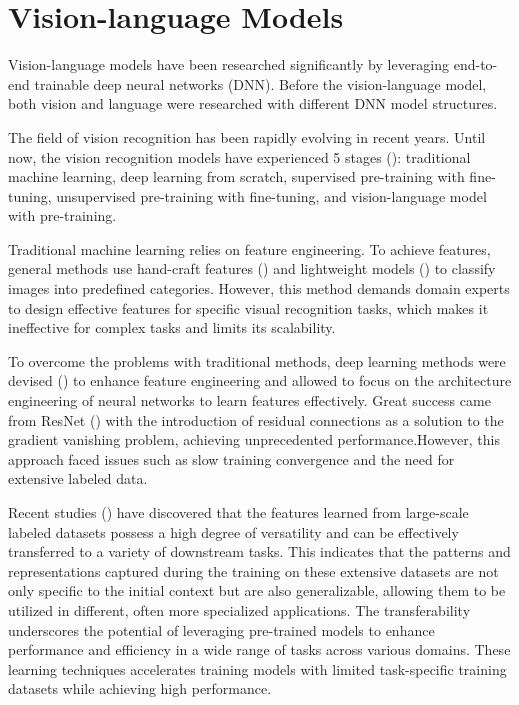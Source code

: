 
\section{Vision-language Models}
Vision-language models have been researched significantly by leveraging end-to-end trainable deep neural networks (DNN). Before the vision-language model, both vision and language were researched with different DNN model structures. 

The field of vision recognition has been rapidly evolving in recent years. Until now, the vision recognition models have experienced 5 stages (\cite{zhang2024visionlanguagemodelsvisiontasks}): traditional machine learning, deep learning from scratch, supervised pre-training with fine-tuning, unsupervised pre-training with fine-tuning, and vision-language model with pre-training.

Traditional machine learning relies on feature engineering. To achieve features, general methods use hand-craft features (\cite{svmclassification}) and lightweight models (\cite{knn, svm}) to classify images into predefined categories. However, this method demands domain experts to design effective features for specific visual recognition tasks, which makes it ineffective for complex tasks and limits its scalability.

To overcome the problems with traditional methods, deep learning methods were devised (\cite{imagenet, dnn_imagerecognition}) to enhance feature engineering and allowed to focus on the architecture engineering of neural networks to learn features effectively. Great success came from ResNet (\cite{resnet}) with the introduction of residual connections as a solution to the gradient vanishing problem, achieving unprecedented performance.However, this approach faced issues such as slow training convergence and the need for extensive labeled data. 

Recent studies (\cite{radford2021learning}) have discovered that the features learned from large-scale labeled datasets possess a high degree of versatility and can be effectively transferred to a variety of downstream tasks. This indicates that the patterns and representations captured during the training on these extensive datasets are not only specific to the initial context but are also generalizable, allowing them to be utilized in different, often more specialized applications. The transferability underscores the potential of leveraging pre-trained models to enhance performance and efficiency in a wide range of tasks across various domains. 
These learning techniques accelerates training models with limited task-specific training datasets while achieving high performance.

